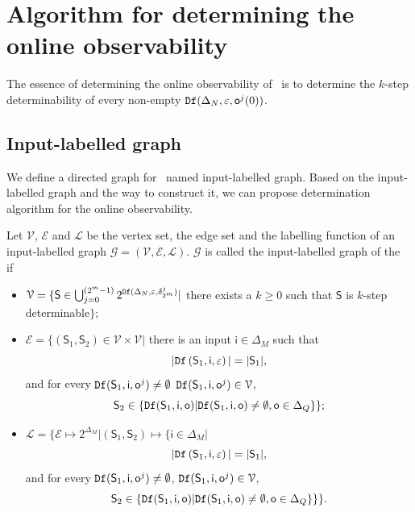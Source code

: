 \section{Algorithm for determining the online observability}
\label{sec:deter}
The essence of determining the online observability of \BCN\ is to determine the $k$-step determinability of every non-empty ${\tt Df}(\Delta_N,\varepsilon, \mathsf{o}^{j}(0))$. 

\subsection{Input-labelled graph}
We define a directed graph for \BCN\ named input-labelled graph. Based on the input-labelled graph and the way to construct it, we can propose determination algorithm for the online observability.

\begin{definition}
Let $\mathcal{V}$, $\mathcal{E}$ and $\mathcal{L}$ be the vertex set, the edge set and the labelling function of an input-labelled graph $\mathcal{G}=(\mathcal{V}, \mathcal{E}, \mathcal{L})$. $\mathcal{G}$ is called the input-labelled graph of the \BCN\, if 
\begin{itemize}
\item  $\mathcal{V}=\{\mathsf{S}\in\bigcup_{j=0}^{(2^m -1)} 2^{{\tt Df}(\Delta_N,\varepsilon,\delta^j_{2^m} )}|$ there exists a $k\ge0$ such that $\mathsf{S}$ is $k$-step determinable$\}$;
\item  $\mathcal{E}=\{(\mathsf{S}_1,\mathsf{S}_2)\in \mathcal{V}\times \mathcal{V}|$ there is an input $\mathsf{i} \in \Delta_M$ such that \[|{\tt Df}\left(\mathsf{S}_1,\mathsf{i},\varepsilon\right)|=|\mathsf{S}_1|,\] and for every ${\tt Df}(\mathsf{S}_1,\mathsf{i},\mathsf{o}^{j})\neq \emptyset$ ${\tt Df}(\mathsf{S}_1,\mathsf{i},\mathsf{o}^{j})\in \mathcal{V}$, \[\mathsf{S}_2\in\{{\tt Df}(\mathsf{S}_1,\mathsf{i},\mathsf{o})| {\tt Df}(\mathsf{S}_1,\mathsf{i},\mathsf{o})\neq \emptyset, \mathsf{o}\in \Delta_Q\}\};\]
\item  $\mathcal{L}=\{\mathcal{E}\mapsto 2^{\Delta_M}|(\mathsf{S}_1,\mathsf{S}_2)\mapsto\{\mathsf{i}\in \Delta_M|$\[|{\tt Df}\left(\mathsf{S}_1,\mathsf{i},\varepsilon\right)|=|\mathsf{S}_1|,\] and for every ${\tt Df}(\mathsf{S}_1,\mathsf{i},\mathsf{o}^{j})\neq \emptyset$, ${\tt Df}(\mathsf{S}_1,\mathsf{i},\mathsf{o}^{j})\in \mathcal{V}$, \[\mathsf{S}_2\in\{{\tt Df}(\mathsf{S}_1,\mathsf{i},\mathsf{o})| {\tt Df}(\mathsf{S}_1,\mathsf{i},\mathsf{o})\neq \emptyset, \mathsf{o}\in \Delta_Q\}\}\}.\]
 \end{itemize}
\end{definition}

